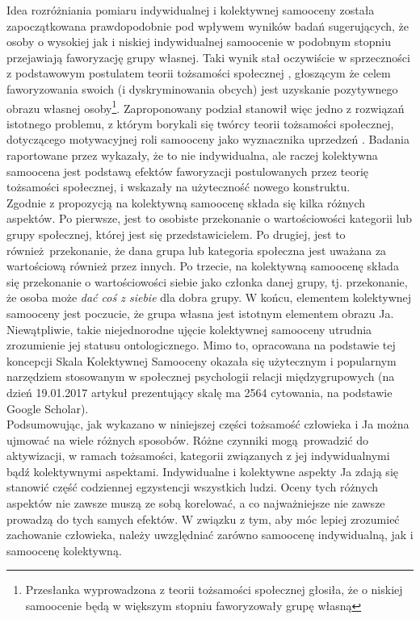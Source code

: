 \documentclass[man]{apa6}
\begin{document}
Idea rozróżniania pomiaru indywidualnej i kolektywnej samooceny została zapoczątkowana prawdopodobnie pod wpływem wyników badań \textcite{crocker1985prejudice} sugerujących, że osoby o wysokiej jak i niskiej indywidualnej samoocenie w podobnym stopniu przejawiają faworyzację grupy własnej. Taki wynik stał oczywiście w sprzeczności z podstawowym postulatem teorii tożsamości społecznej \parencite{tajfel1986social}, głoszącym że celem faworyzowania swoich (i dyskryminowania obcych) jest uzyskanie pozytywnego obrazu własnej osoby\footnote{Przesłanka wyprowadzona z teorii tożsamości społecznej głosiła, że o niskiej samoocenie będą w większym stopniu faworyzowały grupę własną}. Zaproponowany podział stanowił więc jedno z rozwiązań istotnego problemu, z którym borykali się twórcy teorii tożsamości społecznej, dotyczącego motywacyjnej roli samooceny jako wyznacznika uprzedzeń \parencite[zob. np.,][]{abrams1988comments}. Badania raportowane przez \textcite{crocker1990collective} wykazały, że to nie indywidualna, ale raczej kolektywna samoocena jest podstawą efektów faworyzacji postulowanych przez teorię tożsamości społecznej, i wskazały na użyteczność nowego konstruktu.\\

Zgodnie z propozycją \textcite{luhtanen1992collective} na kolektywną samoocenę składa się kilka różnych aspektów. Po pierwsze, jest to osobiste przekonanie o wartościowości kategorii lub grupy społecznej, której jest się przedstawicielem. Po drugiej, jest to również przekonanie, że dana grupa lub kategoria społeczna jest uważana za wartościową również przez innych. Po trzecie, na kolektywną samoocenę składa się przekonanie o wartościowości siebie jako członka danej grupy, tj. przekonanie, że osoba może \emph{dać coś z siebie} dla dobra grupy. W końcu, elementem kolektywnej samooceny jest poczucie, że grupa własna jest istotnym elementem obrazu Ja. Niewątpliwie, takie niejednorodne ujęcie kolektywnej samooceny utrudnia zrozumienie jej statusu ontologicznego. Mimo to, opracowana na podstawie tej koncepcji Skala Kolektywnej Samooceny \parencite{luhtanen1992collective} okazała się użytecznym i popularnym narzędziem stosowanym w społecznej psychologii relacji międzygrupowych (na dzień 19.01.2017 artykuł prezentujący skalę ma 2564 cytowania, na podstawie Google Scholar).\\

Podsumowując, jak wykazano w niniejszej części tożsamość człowieka i Ja można ujmować na wiele różnych sposobów. Różne czynniki mogą prowadzić do aktywizacji, w ramach tożsamości, kategorii związanych z jej indywidualnymi bądź kolektywnymi aspektami. Indywidualne i kolektywne aspekty Ja zdają się stanowić część codziennej egzystencji wszystkich ludzi. Oceny tych różnych aspektów nie zawsze muszą ze sobą korelować, a co najważniejsze nie zawsze prowadzą do tych samych efektów. W związku z tym, aby móc lepiej zrozumieć zachowanie człowieka, należy uwzględniać zarówno samoocenę indywidualną, jak i samoocenę kolektywną.\\
\end{document}
